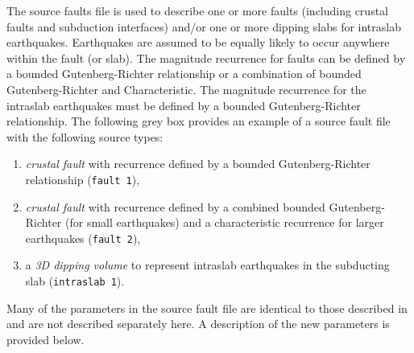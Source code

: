 The source faults file is used to describe one or more faults
(including crustal faults and subduction interfaces) and/or one or
more dipping slabs for intraslab earthquakes. Earthquakes are
assumed to be equally likely to occur anywhere within the fault (or
slab). The magnitude recurrence for faults can be defined by a
bounded Gutenberg-Richter relationship or a combination of bounded
Gutenberg-Richter and Characteristic. The magnitude recurrence for the
intraslab earthquakes must be defined by a bounded Gutenberg-Richter
relationship. The following grey box provides an example of a source
fault file with the following source types:
\begin{enumerate}
\item \textit{crustal fault} with recurrence defined by a bounded Gutenberg-Richter
relationship (\texttt{fault 1}), 
\item \textit{crustal fault} with recurrence defined by a combined bounded Gutenberg-Richter
(for small earthquakes) and a characteristic recurrence for larger
earthquakes (\texttt{fault 2}), 
\item a \textit{3D dipping volume} to represent intraslab earthquakes in the
subducting slab (\texttt{intraslab 1}).
\end{enumerate}
Many of the parameters in the source fault file are identical to
those described in  and are not described
separately here. A description of the new parameters is provided
below. 

